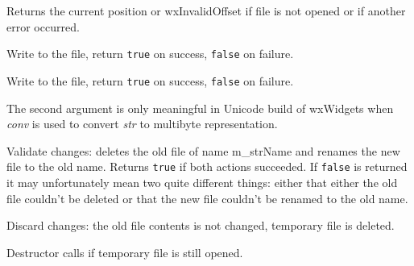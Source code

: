 \label{wxtempfiletell}


Returns the current position or wxInvalidOffset if file is not opened or if another
error occurred.

\label{wxtempfilewrite}


Write to the file, return {\tt true} on success, {\tt false} on failure.

\label{wxtempfilewrites}


Write to the file, return {\tt true} on success, {\tt false} on failure.

The second argument is only meaningful in Unicode build of wxWidgets when
{\it conv} is used to convert {\it str} to multibyte representation.

\label{wxtempfilecommit}


Validate changes: deletes the old file of name m\_strName and renames the new
file to the old name. Returns {\tt true} if both actions succeeded. If {\tt false} is
returned it may unfortunately mean two quite different things: either that
either the old file couldn't be deleted or that the new file couldn't be renamed
to the old name.

\label{wxtempfilediscard}


Discard changes: the old file contents is not changed, temporary file is
deleted.

\label{wxtempfiledtor}


Destructor calls  if temporary file
is still opened.

